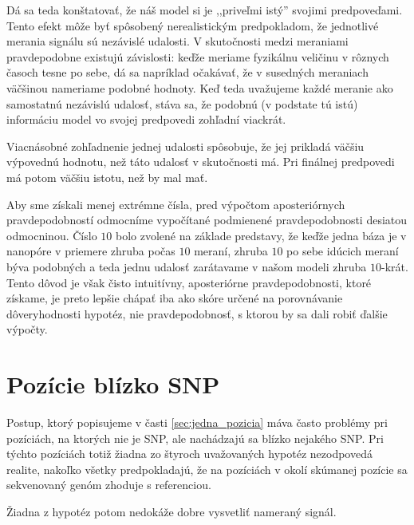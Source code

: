 
Dá sa teda konštatovať, že náš model si je ,,priveľmi istý'' svojimi predpoveďami. Tento efekt môže
byť spôsobený nerealistickým predpokladom, že jednotlivé merania 
signálu sú nezávislé udalosti. V skutočnosti medzi meraniami pravdepodobne existujú závislosti: keďže
meriame fyzikálnu veličinu v rôznych časoch tesne po sebe, dá sa napríklad očakávať, že v susedných
meraniach väčšinou nameriame podobné hodnoty. Keď teda uvažujeme každé meranie ako samostatnú nezávislú 
udalosť, stáva sa, že podobnú (v podstate tú istú) informáciu model vo svojej predpovedi zohľadní
viackrát.

Viacnásobné zohľadnenie jednej udalosti spôsobuje, že jej prikladá väčšiu výpovednú hodnotu, než táto
udalosť v skutočnosti má. Pri finálnej predpovedi má potom väčšiu istotu, než by mal mať.

Aby sme získali menej extrémne čísla, pred výpočtom aposteriórnych pravdepodobností odmocníme vypočítané 
podmienené pravdepodobnosti desiatou odmocninou. Číslo $10$ bolo zvolené na základe predstavy, že
keďže jedna báza je v nanopóre v priemere zhruba počas $10$ meraní, zhruba $10$ po sebe idúcich meraní 
býva podobných a teda jednu udalosť zarátavame v našom modeli zhruba $10$-krát. Tento dôvod je však
čisto intuitívny, aposteriórne pravdepodobnosti, ktoré získame, je preto lepšie chápať iba ako skóre 
určené na porovnávanie dôveryhodnosti hypotéz, nie pravdepodobnosť, s ktorou by sa dali robiť ďalšie 
výpočty.


\section{Pozície blízko SNP}
\label{sec:blizke_pozicie}

Postup, ktorý popisujeme v časti \ref{sec:jedna_pozicia} máva často problémy pri pozíciách, na ktorých nie je SNP, ale nachádzajú
sa blízko nejakého SNP. Pri týchto pozíciách totiž žiadna zo štyroch uvažovaných hypotéz nezodpovedá realite, nakoľko všetky predpokladajú,
že na pozíciách v okolí skúmanej pozície sa sekvenovaný genóm zhoduje s referenciou.


Žiadna z hypotéz potom nedokáže dobre vysvetliť nameraný signál.



